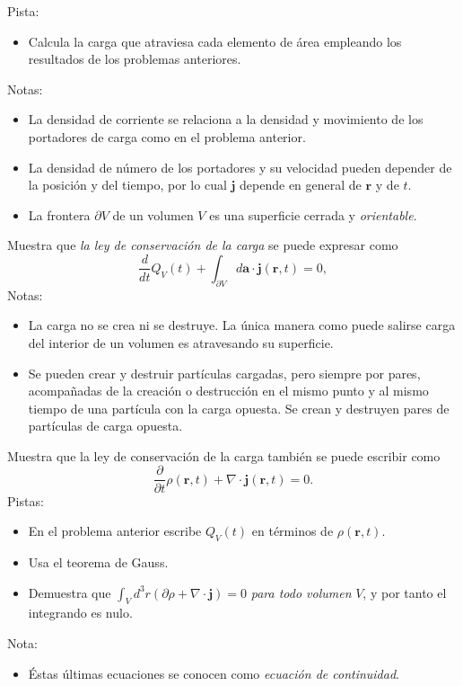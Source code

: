 \documentclass{exam}
\begin{document}
\begin{questions}
    Pista:
    \begin{itemize}
    \item Calcula la carga que atraviesa cada elemento de área
      empleando los resultados de los problemas anteriores.
    \end{itemize}
    Notas:
    \begin{itemize}
    \item La densidad de corriente se relaciona a la densidad y
      movimiento de los portadores de carga como en el problema
      anterior.
    \item La densidad de número de los portadores y su velocidad pueden
      depender de la posición y del tiempo, por lo cual $\bm j$
      depende en general de $\bm r$ y de $t$.
    \item La frontera $\partial V$ de un volumen $V$ es una superficie
      cerrada y {\em orientable}.
    \end{itemize}
  \question Muestra que {\em la ley de conservación de la carga} se
    puede expresar como
    $$
    \frac{d}{dt}Q_V(t)+\int_{\partial V}d\bm a\cdot\bm j(\bm r,t)=0,
    $$
    Notas:
    \begin{itemize}
    \item La carga no se crea ni se destruye. La única manera como
      puede salirse carga del interior de un volumen es atravesando su
      superficie.
    \item Se pueden crear y destruir partículas cargadas, pero siempre
      por pares, acompañadas de la creación o destrucción en el mismo
      punto y al mismo tiempo de una partícula con la carga
      opuesta. Se crean y destruyen pares de partículas de carga
      opuesta.
    \end{itemize}
  \question Muestra que la ley de conservación de la carga también se puede
    escribir como
    $$ \frac{\partial}{\partial t}\rho(\bm r,t)+\nabla\cdot\bm j(\bm
    r,t)=0.$$
    Pistas:
    \begin{itemize}
    \item En el problema anterior escribe $Q_V(t)$ en términos de
      $\rho(\bm r,t)$.
    \item Usa el teorema de Gauss.
    \item Demuestra que $\int_Vd^3r(\partial\rho+\nabla\cdot\bm j)=0$
      {\em para todo volumen} $V$, y por tanto el integrando es nulo.
    \end{itemize}
    Nota:
    \begin{itemize}
    \item Éstas últimas ecuaciones se conocen como {\em ecuación de
        continuidad}.
    \end{itemize}


\end{questions}
\end{document}

